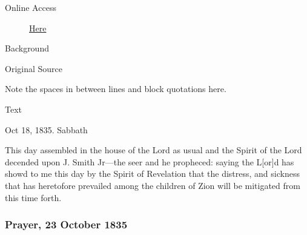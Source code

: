 			\begin{description}
				\item[Online Access] \href{https://www.josephsmithpapers.org/paper-summary/revelation-18-october-1835/1}{Here}
			\end{description}
			
			\begin{description}
				\item[Background]
			\end{description}
			
			
			\begin{description}
				\item[Original Source]
			\end{description}
			
				
				Note the spaces in between lines and block quotations here.
			
			\begin{description}
				\item[Text]
			\end{description}
			
				Oct 18, 1835. Sabbath
				
				This day assembled in the house of the Lord as usual and the Spirit of the Lord decended upon J. Smith Jr---the seer and he propheced: saying the L[or]d has showd to me this day by the Spirit of Revelation that the distress, and sickness that has heretofore prevailed among the children of Zion will be mitigated from this time forth.
				
		\subsubsection{Prayer, 23 October 1835}
			\label{EMS-1835-JS-23-OCT-1835}
			

